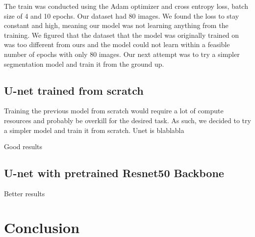 \documentclass{ieeeaccess}
\begin{document}
The train was conducted using the Adam optimizer and cross entropy loss, batch size of 4 and 10 epochs. Our dataset had 80 images. We
found the loss to stay constant and high, meaning our model was not learning anything from the training. We figured that the dataset
that the model was originally trained on was too different from ours and the model could not learn within a feasible number of epochs
with only 80 images. Our next attempt was to try a simpler segmentation model and train it from the ground up.

\subsection{U-net trained from scratch}

Training the previous model from scratch would require a lot of compute resources and probably be overkill for the desired task. As
such, we decided to try a simpler model and train it from scratch. Unet is blablabla

Good results

\subsection{U-net with pretrained Resnet50 Backbone}

Better results



\section{Conclusion}

  \lipsum[1-2]

\EOD
\end{document}
